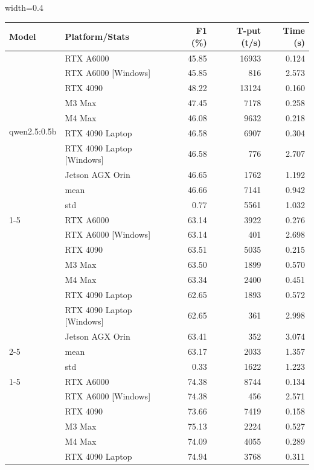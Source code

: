 \documentclass[conference]{IEEEtran}
\begin{document}
\begin{table}[htbp]
    \centering
    \begin{adjustbox}{width=0.4\textwidth}
    \begin{tabular}{llrrr}
\toprule
\textbf{Model} & \textbf{Platform/Stats} & \textbf{F1 (\%)} & \textbf{T-put (t/s)} & \textbf{Time (s)} \\
\midrule
\multirow[t]{10}{*}{qwen2.5:0.5b} & RTX A6000 & 45.85 & 16933 & 0.124 \\
 & RTX A6000 [Windows] & 45.85 & 816 & 2.573 \\
 & RTX 4090 & 48.22 & 13124 & 0.160 \\
 & M3 Max & 47.45 & 7178 & 0.258 \\
 & M4 Max & 46.08 & 9632 & 0.218 \\
 & RTX 4090 Laptop & 46.58 & 6907 & 0.304 \\
 & RTX 4090 Laptop [Windows] & 46.58 & 776 & 2.707 \\
 & Jetson AGX Orin & 46.65 & 1762 & 1.192 \\
 \cmidrule(lr){2-5}
 & mean & 46.66 & 7141 & 0.942 \\
 & std & 0.77 & 5561 & 1.032 \\
\cline{1-5}
\multirow[t]{10}{*}{llama3.2:1b} & RTX A6000 & 63.14 & 3922 & 0.276 \\
 & RTX A6000 [Windows] & 63.14 & 401 & 2.698 \\
 & RTX 4090 & 63.51 & 5035 & 0.215 \\
 & M3 Max & 63.50 & 1899 & 0.570 \\
 & M4 Max & 63.34 & 2400 & 0.451 \\
 & RTX 4090 Laptop & 62.65 & 1893 & 0.572 \\
 & RTX 4090 Laptop [Windows] & 62.65 & 361 & 2.998 \\
 & Jetson AGX Orin & 63.41 & 352 & 3.074 \\
 \cmidrule(lr){2-5}
 & mean & 63.17 & 2033 & 1.357 \\
 & std & 0.33 & 1622 & 1.223 \\
\cline{1-5}
\multirow[t]{10}{*}{qwen2.5:1.5b} & RTX A6000 & 74.38 & 8744 & 0.134 \\
 & RTX A6000 [Windows] & 74.38 & 456 & 2.571 \\
 & RTX 4090 & 73.66 & 7419 & 0.158 \\
 & M3 Max & 75.13 & 2224 & 0.527 \\
 & M4 Max & 74.09 & 4055 & 0.289 \\
 & RTX 4090 Laptop & 74.94 & 3768 & 0.311 \\

\end{tabular}
\end{adjustbox}
\end{table}
\end{document}
